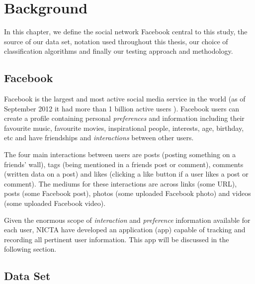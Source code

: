 
\chapter{Background}
\label{cha:back}

In this chapter, we define the social network Facebook central to this study, the source of our data set, notation used throughout 
this thesis, our choice of classification algorithms and finally our testing approach and methodology.

\section{Facebook}
\label{sec:data}

Facebook is the largest and most active social media service in the world (as of September 2012 it had more than 1 billion active users \cite{fbsize}).
Facebook users can create a profile containing personal \emph{preferences} and information including their favourite music, favourite movies, 
inspirational people, interests, age, birthday, etc and have friendships and \emph{interactions} between other users. 

The four main interactions between users are posts (posting something on a friends' wall), 
tags (being mentioned in a friends post or comment), comments (written data on a post) and likes (clicking a like button if a user 
likes a post or comment). The mediums for these interactions are across links (some URL), posts (some Facebook post), 
photos (some uploaded Facebook photo) and videos (some uploaded Facebook video).

Given the enormous scope of \emph{interaction} and \emph{preference} information available for each user, NICTA have developed an application (app) capable of tracking 
and recording all pertinent user information. This app will be discussed in the following section.


\section{Data Set}
\label{sec:linkr}

